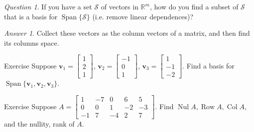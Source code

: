 \documentclass{beamer}
\DeclareMathOperator{\Nul}{Nul}
\DeclareMathOperator{\Col}{Col}
\DeclareMathOperator{\Row}{Row}
\theoremstyle{definition}
\theoremstyle{remark}
\newtheorem*{question}{Question}
\newtheorem*{answer}{Answer}
\DeclareMathOperator{\Span}{Span}
\begin{document}
\begin{frame}[t]
\begin{question}
If you have a set $\mathcal S$ of vectors in $\mathbb R^m$, how do you find a subset of $\mathcal S$ that is a basis for $\Span\{\mathcal S\}$ (i.e. remove linear dependences)?
\end{question}
\pause
\begin{answer}
Collect these vectors as the column vectors of a matrix, and then find its columns space.
\end{answer}
\end{frame}

\begin{frame}[t]{Exercise}
Suppose $\mathbf v_1=\begin{bmatrix}
1\\2\\1
\end{bmatrix}$, $\mathbf v_2=\begin{bmatrix}
-1\\0\\1
\end{bmatrix}$, $\mathbf v_3=\begin{bmatrix}
1\\-1\\-2
\end{bmatrix}$. Find a basis for $\Span\{\mathbf v_1, \mathbf v_2, \mathbf v_3\}$.
\end{frame}

\begin{frame}[t]{Exercise}
Suppose $A=\begin{bmatrix}
1&-7&0&6&5\\
0&0&1&-2&-3\\
-1&7&-4&2&7
\end{bmatrix}$. Find $\Nul A,\Row A,\Col A$, and the nullity, rank of $A$.
\end{frame}


\end{document}
